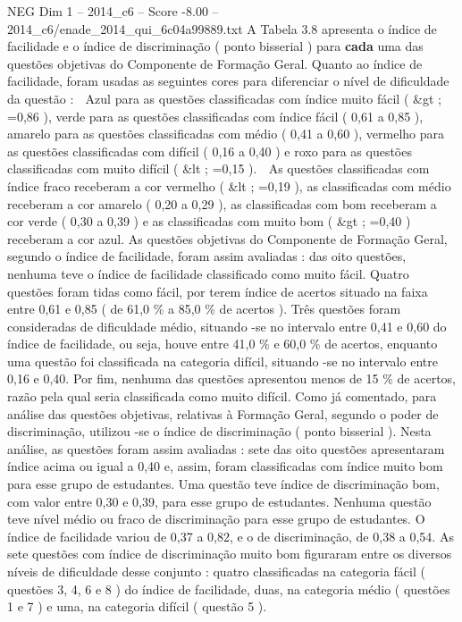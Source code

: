 \begin{textsample}{NEG Dim 1 – 2014\_c6 – Score -8.00 – 2014\_c6/enade\_2014\_qui\_6c04a99889.txt}
A Tabela 3.8 apresenta o índice de facilidade e o índice de discriminação ( ponto bisserial ) para \textbf{cada} uma das questões objetivas do Componente de Formação Geral.
Quanto ao índice de facilidade, foram usadas as seguintes cores para diferenciar o nível de dificuldade da questão :  Azul para as questões classificadas com índice muito fácil ( \&gt ; =0,86 ), verde para as questões classificadas com índice fácil ( 0,61 a 0,85 ), amarelo para as questões classificadas com médio ( 0,41 a 0,60 ), vermelho para as questões classificadas com difícil ( 0,16 a 0,40 ) e roxo para as questões classificadas com muito difícil ( \&lt ; =0,15 ).  As questões classificadas com índice fraco receberam a cor vermelho ( \&lt ; =0,19 ), as classificadas com médio receberam a cor amarelo ( 0,20 a 0,29 ), as classificadas com bom receberam a cor verde ( 0,30 a 0,39 ) e as classificadas com muito bom ( \&gt ; =0,40 ) receberam a cor azul.
As questões objetivas do Componente de Formação Geral, segundo o índice de facilidade, foram assim avaliadas : das oito questões, nenhuma teve o índice de facilidade classificado como muito fácil.
Quatro questões foram tidas como fácil, por terem índice de acertos situado na faixa entre 0,61 e 0,85 ( de 61,0 \% a 85,0 \% de acertos ).
Três questões foram consideradas de dificuldade médio, situando -se no intervalo entre 0,41 e 0,60 do índice de facilidade, ou seja, houve entre 41,0 \% e 60,0 \% de acertos, enquanto uma questão foi classificada na categoria difícil, situando -se no intervalo entre 0,16 e 0,40.
Por fim, nenhuma das questões apresentou menos de 15 \% de acertos, razão pela qual seria classificada como muito difícil.
Como já comentado, para análise das questões objetivas, relativas à Formação Geral, segundo o poder de discriminação, utilizou -se o índice de discriminação ( ponto bisserial ).
Nesta análise, as questões foram assim avaliadas : sete das oito questões apresentaram índice acima ou igual a 0,40 e, assim, foram classificadas com índice muito bom para esse grupo de estudantes.
Uma questão teve índice de discriminação bom, com valor entre 0,30 e 0,39, para esse grupo de estudantes.
Nenhuma questão teve nível médio ou fraco de discriminação para esse grupo de estudantes.
O índice de facilidade variou de 0,37 a 0,82, e o de discriminação, de 0,38 a 0,54.
As sete questões com índice de discriminação muito bom figuraram entre os diversos níveis de dificuldade desse conjunto : quatro classificadas na categoria fácil ( questões 3, 4, 6 e 8 ) do índice de facilidade, duas, na categoria médio ( questões 1 e 7 ) e uma, na categoria difícil ( questão 5 ).

\end{textsample}
